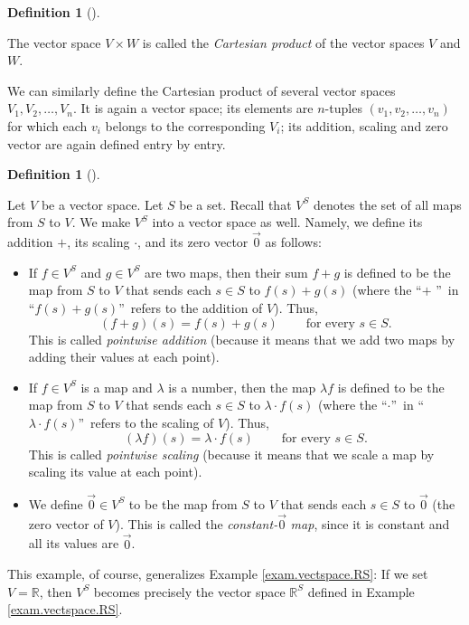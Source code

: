 \documentclass[numbers=enddot,12pt,final,onecolumn,notitlepage]{scrartcl}%
\theoremstyle{definition}
\newtheorem{defi}[theo]{Definition}
\newenvironment{definition}[1][]
{\begin{defi}[#1]\begin{leftbar}}
{\end{leftbar}\end{defi}}
\begin{document}
\begin{definition}
The vector space $V\times W$ is called the \textit{Cartesian product} of the
vector spaces $V$ and $W$.

We can similarly define the Cartesian product of several vector spaces
$V_{1},V_{2},\ldots,V_{n}$. It is again a vector space; its elements are
$n$-tuples $\left(  v_{1},v_{2},\ldots,v_{n}\right)  $ for which each $v_{i}$
belongs to the corresponding $V_{i}$; its addition, scaling and zero vector
are again defined entry by entry.
\end{definition}

\begin{definition}
\label{def.vectspace.StoV}Let $V$ be a vector space. Let $S$ be a set. Recall
that $V^{S}$ denotes the set of all maps from $S$ to $V$. We make $V^{S}$ into
a vector space as well. Namely, we define its addition $+$, its scaling
$\cdot$, and its zero vector $\overrightarrow{0}$ as follows:

\begin{itemize}
\item If $f\in V^{S}$ and $g\in V^{S}$ are two maps, then their sum $f+g$ is
defined to be the map from $S$ to $V$ that sends each $s\in S$ to $f\left(
s\right)  +g\left(  s\right)  $ (where the \textquotedblleft$+$%
\textquotedblright\ in \textquotedblleft$f\left(  s\right)  +g\left(
s\right)  $\textquotedblright\ refers to the addition of $V$). Thus,%
\[
\left(  f+g\right)  \left(  s\right)  =f\left(  s\right)  +g\left(  s\right)
\ \ \ \ \ \ \ \ \ \ \text{for every }s\in S.
\]
This is called \textit{pointwise addition} (because it means that we add two
maps by adding their values at each point).

\item If $f\in V^{S}$ is a map and $\lambda$ is a number, then the map
$\lambda f$ is defined to be the map from $S$ to $V$ that sends each $s\in S$
to $\lambda\cdot f\left(  s\right)  $ (where the \textquotedblleft$\cdot
$\textquotedblright\ in \textquotedblleft$\lambda\cdot f\left(  s\right)
$\textquotedblright\ refers to the scaling of $V$). Thus,%
\[
\left(  \lambda f\right)  \left(  s\right)  =\lambda\cdot f\left(  s\right)
\ \ \ \ \ \ \ \ \ \ \text{for every }s\in S.
\]
This is called \textit{pointwise scaling} (because it means that we scale a
map by scaling its value at each point).

\item We define $\overrightarrow{0}\in V^{S}$ to be the map from $S$ to $V$
that sends each $s\in S$ to $\overrightarrow{0}$ (the zero vector of $V$).
This is called the \textit{constant-}$\overrightarrow{0}$\textit{ map}, since
it is constant and all its values are $\overrightarrow{0}$.
\end{itemize}

This example, of course, generalizes Example \ref{exam.vectspace.RS}: If we
set $V=\mathbb{R}$, then $V^{S}$ becomes precisely the vector space
$\mathbb{R}^{S}$ defined in Example \ref{exam.vectspace.RS}.
\end{definition}
\end{document}
